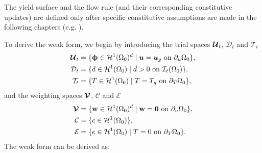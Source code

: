 The yield surface and the flow rule (and their corresponding constitutive updates) are defined only after specific constitutive assumptions are made in the following chapters (e.g. ).

To derive the weak form, we begin by introducing the trial spaces $\boldsymbol{\mathcal{U}}_t$, $\mathcal{D}_t$ and $\mathcal{T}_t$
\begin{subequations}
\begin{align}
  \boldsymbol{\mathcal{U}}_t &= \{ \boldsymbol{\upphi} \in \mathcal{H}^1(\Omega_0)^d \mid \boldsymbol{u} = \boldsymbol{u}_g \text{ on } \partial_u\Omega_0 \}, \\
  \mathcal{D}_t &= \{ d \in \mathcal{H}^1(\Omega_0) \mid \dot{d} > 0 \text{ on } \mathcal{I}_t(\Omega_0) \}, \\
  \mathcal{T}_t &= \{ T \in \mathcal{H}^1(\Omega_0) \mid T = T_g \text{ on } \partial_T\Omega_0 \},
\end{align}
\end{subequations}
and the weighting spaces $\boldsymbol{\mathcal{V}}$, $\mathcal{C}$ and $\mathcal{E}$
\begin{subequations}
\begin{align}
  \boldsymbol{\mathcal{V}} &= \{ \textbf{w} \in \mathcal{H}^1(\Omega_0)^d \mid \textbf{w} = \boldsymbol{0} \text{ on } \partial_u\Omega_0 \}, \\
  \mathcal{C} &= \{ c \in \mathcal{H}^1(\Omega_0) \}, \\
  \mathcal{E} &= \{ e \in \mathcal{H}^1(\Omega_0) \mid T = 0 \text{ on } \partial_T\Omega_0 \}.
\end{align}
\end{subequations}
The weak form can be derived as:
